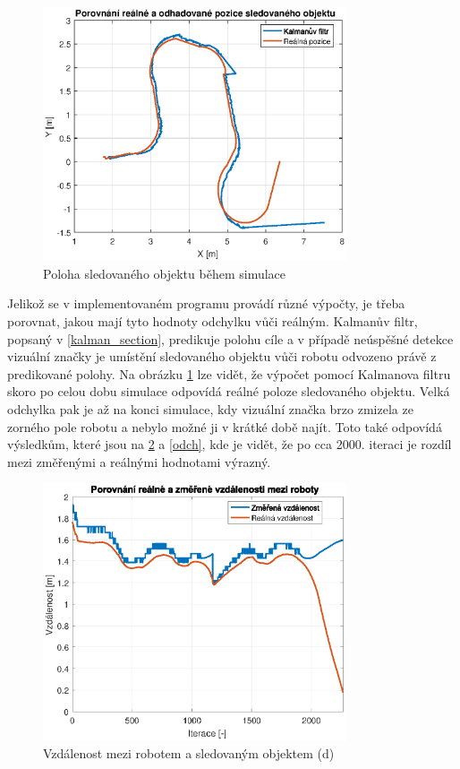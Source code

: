 \documentclass[twoside]{ctuthesis}
\theoremstyle{plain}
\theoremstyle{definition}
\theoremstyle{note}
\begin{document}
\begin{figure}[hbt]
	\caption{Poloha sledovaného objektu během simulace}

	\label{sled}
	\includegraphics[width=0.8\textwidth]{images/5/pos_pioner.eps}
\end{figure}

Jelikož se v implementovaném programu provádí různé výpočty, je třeba porovnat, jakou mají tyto hodnoty odchylku vůči reálným. Kalmanův filtr, popsaný v \ref{kalman_section}, predikuje polohu cíle a v případě neúspěšné detekce vizuální značky je umístění sledovaného objektu vůči robotu odvozeno právě z predikované polohy. Na obrázku \ref{sled} lze vidět, že výpočet pomocí Kalmanova filtru skoro po celou dobu simulace odpovídá reálné poloze sledovaného objektu. Velká odchylka pak je až na konci simulace, kdy vizuální značka brzo zmizela ze zorného pole robotu a nebylo možné ji v krátké době najít. Toto také odpovídá výsledkům, které jsou na \ref{dist} a \ref{odch}, kde je vidět, že po cca 2000. iteraci je rozdíl mezi změřenými a reálnými hodnotami výrazný.


\begin{figure}[H]
	\caption{Vzdálenost mezi robotem a sledovaným objektem (d)}

	\label{dist}
	\includegraphics[width=0.8\textwidth]{images/5/dist.eps}
\end{figure}
\end{document}
